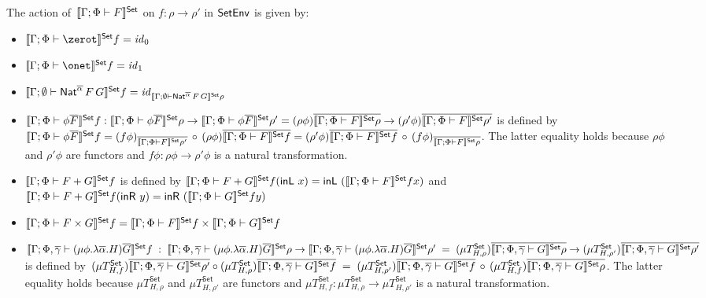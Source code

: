 \documentclass[runningheads]{llncs}
\newcommand{\set}{\mathsf{Set}}
\renewcommand{\id}{\mathit{id}}
\renewcommand{\id}{\mathit{id}}
\newcommand{\inl}{\mathsf{inL}\,}
\newcommand{\inr}{\mathsf{inR}\,}
\begin{document}
\begin{definition}\label{def:set-sem-funcs}
The action
of\, $\setsem{\Gamma;\Phi \vdash F}$
on
$f : \rho \to \rho'$ in $\mathsf{SetEnv}$ is given by:
\begin{itemize}
\item
 $\setsem{\Gamma;\Phi \vdash \zerot}f = \id_0$
\item
  $\setsem{\Gamma;\Phi \vdash \onet}f = \id_1$
\item 
  $\setsem{\Gamma; \emptyset
    \vdash \Nat^{\ol{\alpha}}\,F\,G} f =
  \id_{\setsem{\Gamma; \emptyset
      \vdash \Nat^{\ol{\alpha}}\,F\,G}\rho}$
\item 
$\setsem{\Gamma;\Phi \vdash \phi \ol{F}} f : \setsem{\Gamma;\Phi
  \vdash \phi \ol{F}}\rho \to \setsem{\Gamma;\Phi \vdash
  \phi\ol{F}}\rho' = (\rho\phi) \ol{\setsem{\Gamma;\Phi \vdash F}\rho}
  \to (\rho'\phi) \ol{\setsem{\Gamma;\Phi \vdash F}\rho'}$ is defined
  by $\setsem{\Gamma;\Phi \vdash \phi \ol{F}} f =
  (f\phi)_{\ol{\setsem{\Gamma;\Phi \vdash F}\rho'}}\, \circ\,
  (\rho\phi) {\ol{\setsem{\Gamma;\Phi \vdash F}f}} = (\rho'\phi)
  {\ol{\setsem{\Gamma;\Phi \vdash F}f}}\, \circ\, (f
  \phi)_{\ol{\setsem{\Gamma;\Phi \vdash F}\rho}}$.  The latter
  equality holds because $\rho\phi$ and $\rho'\phi$ are functors and
  $f\phi : \rho\phi \to \rho'\phi$ is a natural transformation.
\item 
  $\setsem{\Gamma;\Phi
  \vdash F + G}f$ is defined by $\setsem{\Gamma;\Phi \vdash
  F + G}f(\inl\,x) = \inl\,(\setsem{\Gamma;\Phi \vdash
  F}f x)$ and $\setsem{\Gamma;\Phi \vdash F +
  G}f(\inr\,y) = \inr\,(\setsem{\Gamma;\Phi \vdash G}f y)$
\item 
  $\setsem{\Gamma;\Phi \vdash F \times G}f = 
  \setsem{\Gamma;\Phi \vdash F}f \times \setsem{\Gamma;\Phi \vdash
    G}f$
\item 
$\setsem{\Gamma;\Phi,\ol\gamma \vdash (\mu \phi.\lambda
  \ol{\alpha}. H)\ol{G}} f \;: \;\setsem{\Gamma;\Phi,\ol\gamma \vdash
  (\mu \phi.\lambda \ol{\alpha}. H)\ol{G}} \rho \to
  \setsem{\Gamma;\Phi,\ol\gamma \vdash (\mu
    \phi.\lambda\ol{\alpha}. H)\ol{G}} \rho' \;= \;(\mu
  T^\set_{H,\rho})\ol{\setsem{\Gamma;\Phi,\ol\gamma \vdash G}\rho} \to
  (\mu T^\set_{H,\rho'})\ol{\setsem{\Gamma;\Phi,\ol\gamma \vdash
      G}\rho'}$ is defined by $(\mu
  T^\set_{H,f})\ol{\setsem{\Gamma;\Phi,\ol\gamma \vdash G}\rho'} \circ
  (\mu T^\set_{H,\rho})\ol{\setsem{\Gamma;\Phi,\ol\gamma \vdash G}f}\;
  = \; (\mu T^\set_{H,\rho'})\ol{\setsem{\Gamma;\Phi,\ol\gamma \vdash
      G}f}\, \circ\, (\mu
  T^\set_{H,f})\ol{\setsem{\Gamma;\Phi,\ol\gamma \vdash G}\rho}$.  The
  latter equality holds because $\mu T^\set_{H,\rho}$ and $\mu
  T^\set_{H,\rho'}$ are functors and $\mu T_{H,f}^\set : \mu
  T_{H,\rho}^\set \to \mu T_{H,\rho'}^\set$ is a natural
  transformation.
\end{itemize}
\end{definition}
\end{document}
